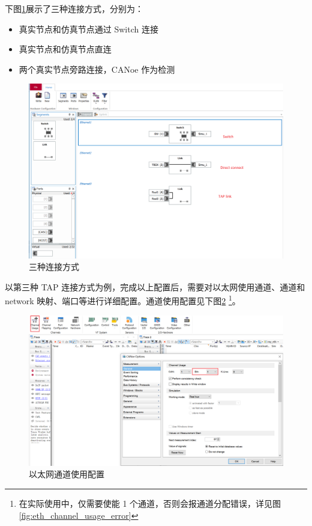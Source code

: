 下图\ref{fig:three_connect_ways}展示了三种连接方式，分别为：
\begin{itemize}
    \item 真实节点和仿真节点通过 Switch 连接
    \item 真实节点和仿真节点直连
    \item 两个真实节点旁路连接，CANoe 作为检测
\end{itemize}

\begin{figure}[!ht]
    \centering
    \includegraphics[scale=0.5]{pic/Snipaste_2021-10-29_15-06-06.png}
    \caption{三种连接方式}
    \label{fig:three_connect_ways}
\end{figure}

以第三种 TAP 连接方式为例，完成以上配置后，需要对以太网使用通道、通道和 network 映射、端口等进行详细配置。通道使用配置见下图\ref{fig:eth_channel_usage} \footnote{在实际使用中，仅需要使能 1 个通道，否则会报通道分配错误，详见图\ref{fig:eth_channel_usage_error}}。

\begin{figure}[ht]
    \centering
    \includegraphics[scale=0.5]{pic/Snipaste_2021-10-29_15-18-52.png}
    \caption{以太网通道使用配置}
    \label{fig:eth_channel_usage}
\end{figure}

